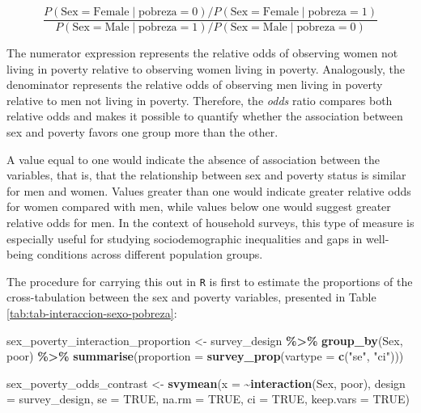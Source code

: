 \documentclass[
  english,
  12pt,
]{book}
\newenvironment{Shaded}{\begin{snugshade}}{\end{snugshade}}
\newcommand{\AttributeTok}[1]{\textcolor[rgb]{0.13,0.29,0.53}{#1}}
\newcommand{\ConstantTok}[1]{\textcolor[rgb]{0.56,0.35,0.01}{#1}}
\newcommand{\FunctionTok}[1]{\textcolor[rgb]{0.13,0.29,0.53}{\textbf{#1}}}
\newcommand{\NormalTok}[1]{#1}
\newcommand{\OtherTok}[1]{\textcolor[rgb]{0.56,0.35,0.01}{#1}}
\newcommand{\SpecialCharTok}[1]{\textcolor[rgb]{0.81,0.36,0.00}{\textbf{#1}}}
\newcommand{\StringTok}[1]{\textcolor[rgb]{0.31,0.60,0.02}{#1}}
\begin{document}
\[
\frac{
P(\text{Sex}=\text{Female} \mid \text{pobreza}=0)
\big/
P(\text{Sex}=\text{Female} \mid \text{pobreza}=1)
}{
P(\text{Sex}=\text{Male} \mid \text{pobreza}=1)
\big/
P(\text{Sex}=\text{Male} \mid \text{pobreza}=0)
}
\]

The numerator expression represents the relative odds of observing women not living in poverty relative to observing women living in poverty. Analogously, the denominator represents the relative odds of observing men living in poverty relative to men not living in poverty. Therefore, the \emph{odds} ratio compares both relative odds and makes it possible to quantify whether the association between sex and poverty favors one group more than the other.

A value equal to one would indicate the absence of association between the variables, that is, that the relationship between sex and poverty status is similar for men and women. Values greater than one would indicate greater relative odds for women compared with men, while values below one would suggest greater relative odds for men. In the context of household surveys, this type of measure is especially useful for studying sociodemographic inequalities and gaps in well-being conditions across different population groups.

The procedure for carrying this out in \texttt{R} is first to estimate the proportions of the cross-tabulation between the sex and poverty variables, presented in Table \ref{tab:tab-interaccion-sexo-pobreza}:

\begin{Shaded}
\begin{Highlighting}[]
\NormalTok{sex\_poverty\_interaction\_proportion }\OtherTok{\textless{}{-}}\NormalTok{ survey\_design }\SpecialCharTok{\%\textgreater{}\%}
  \FunctionTok{group\_by}\NormalTok{(Sex, poor) }\SpecialCharTok{\%\textgreater{}\%}
  \FunctionTok{summarise}\NormalTok{(}\AttributeTok{proportion =} \FunctionTok{survey\_prop}\NormalTok{(}\AttributeTok{vartype =} \FunctionTok{c}\NormalTok{(}\StringTok{"se"}\NormalTok{, }\StringTok{"ci"}\NormalTok{)))}

\NormalTok{sex\_poverty\_odds\_contrast }\OtherTok{\textless{}{-}} \FunctionTok{svymean}\NormalTok{(}\AttributeTok{x =} \SpecialCharTok{\textasciitilde{}}\FunctionTok{interaction}\NormalTok{(Sex, poor),}
                                     \AttributeTok{design =}\NormalTok{ survey\_design,}
                                     \AttributeTok{se =} \ConstantTok{TRUE}\NormalTok{, }\AttributeTok{na.rm =} \ConstantTok{TRUE}\NormalTok{, }\AttributeTok{ci =} \ConstantTok{TRUE}\NormalTok{,}
                                     \AttributeTok{keep.vars =} \ConstantTok{TRUE}\NormalTok{)}
\end{Highlighting}
\end{Shaded}
\end{document}
